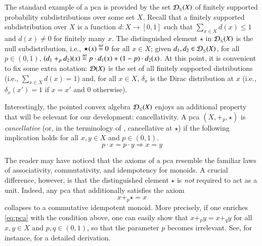 The standard example of a pca is provided by the set $\mathcal{D}_{\leq}(X)$ of finitely supported probability subdistributions over some set $X$. Recall that a finitely supported subdistribution over  $X$ is a function $d\colon X \to [0,1]$ such that $\sum_{x\in X}d(x)\leq1$ and $d(x)\neq 0$ for finitely many $x$. The distinguished element $\star$ in $\mathcal{D}_{\leq}(X)$ is the null subdistribution, i.e., $\star(x)\stackrel{\text{\tiny def}}{=} 0$ for all $x\in X$; given $d_1,d_2\in \mathcal{D}_{\leq}(X)$, for all $p\in(0,1)$, $(d_1+_pd_2)(x) \stackrel{\text{\tiny def}}{=} p\cdot d_1(x)+ (1-p)\cdot d_2(x)$. At this point, it is convenient to fix some extra notation: $\mathcal{D}(X)$ is the set of all finitely supported distributions (i.e., $\sum_{x\in X}d(x)=1$) and, for all $x\in X$, $\delta_x$ is the Dirac distribution at $x$ (i.e., $\delta_x(x')=1$ if $x=x'$ and $0$ otherwise).

Interestingly, the pointed convex algebra $\mathcal{D}_{\leq}(X)$  enjoys an additional property that will be relevant for our development: cancellativity. A pca $(X,+_p,\star)$ is \emph{cancellative} (or, in the terminology of \cite{sokolova2018termination}, cancellative at $\star$) if the following implication holds for all $x,y\in X$ and $p\in(0,1)$.
\begin{equation*}
p\cdot x = p\cdot y \Rightarrow x=y
\end{equation*}
\begin{remark}\label{rmk:collapsed}
The reader may have noticed that the axioms of a pca resemble the familiar laws of
associativity, commutativity, and idempotency for monoids. A crucial
difference, however, is that the distinguished element $\star$ is \emph{not} required
to act as a unit. Indeed, any pca that additionally satisfies the axiom
\begin{equation}\label{eq:unitstar}
x+_p \star = x
\end{equation}
collapses to a commutative idempotent monoid. More precisely, if one enriches
\eqref{eq:pca} with the condition above, one can easily show that
$
x+_p y = x+_q y$
for all $x,y\in X$ and $p,q\in(0,1)$,
so that the parameter $p$ becomes irrelevant. See, for instance, \cite{DBLP:journals/lmcs/BonchiSV22} for a detailed derivation.
\end{remark}






